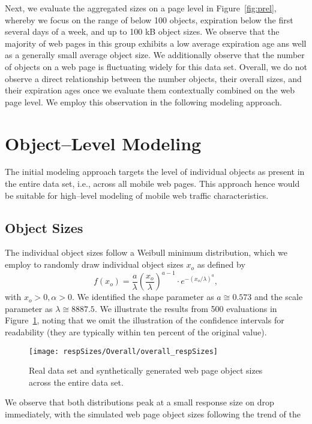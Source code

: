 \documentclass[letterpaper,conference]{IEEEtran}
\begin{document}
Next, we evaluate the aggregated sizes on a page level in Figure~\ref{fig:prel}, whereby we focus on the range of below 100 objects, expiration below the first several days of a week, and up to 100 kB object sizes.
We observe that the majority of web pages in this group exhibits a low average expiration age ans well as a generally small average object size.
We additionally observe that the number of objects on a web page is fluctuating widely for this data set.
Overall, we do not observe a direct relationship between the number objects, their overall sizes, and their expiration ages once we evaluate them contextually combined on the web page level.
We employ this observation in the following modeling approach.


\section{Object--Level Modeling}
\label{s:object}
The initial modeling approach targets the level of individual objects as present in the entire data set, i.e., across all mobile web pages. 
This approach hence would be suitable for high--level modeling of mobile web traffic characteristics.

\subsection{Object Sizes}
The individual object sizes follow a Weibull minimum distribution, which we employ to randomly draw individual object sizes $x_o$ as defined by 
\begin{equation}\label{eq:weibull}
f(x_o) = \frac{a}{\lambda} \left(\frac{x_o}{\lambda}\right)^{a-1} \cdot e^{-(x_o/\lambda)^a}, 
\end{equation}
with $x_o>0, \alpha>0$.
We identified the shape parameter as $a \cong  0.573$ and the scale parameter as $\lambda \cong 8887.5$.
We illustrate the results from 500 evaluations in Figure~\ref{fig:osize}, noting that we omit the illustration of the confidence intervals for readability (they are typically within ten percent of the original value).
\begin{figure}
	\centering
	\texttt{[image: respSizes/Overall/overall\_respSizes]}
	\caption{Real data set and synthetically generated web page object sizes across the entire data set.}
	\label{fig:osize}
\end{figure}
We observe that both distributions peak at a small response size on drop immediately, with the simulated web page object sizes following the trend of the underlying data set closely.
Due to the nature of the selected Weibull distribution for simulation purposes, the smaller abrupt changes in the distribution of sizes visible for the source data, e.g. between object sizes of 10 kB and 20 kB, are not captured in the modeled distribution.
We reason that the tractability and otherwise close fit, however, outweigh the capturing of these minor irregularities.
\end{document}
